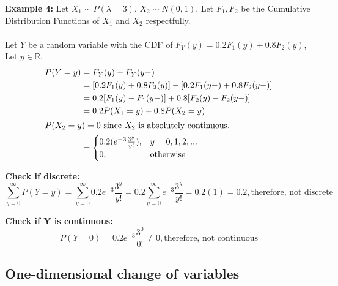 \documentclass[12pt]{article}
\begin{document}
\textbf{Example 4:} Let $X_1 \sim P(\lambda = 3)$, $X_2 \sim N(0,1)$. Let $F_1, F_2$ be the Cumulative Distribution Functions of $X_1$ and $X_2$ respectfully.\\
\\
Let $Y$ be a random variable with the CDF of $F_Y (y) = 0.2 F_1 (y) + 0.8 F_2 (y)$, Let $y\in\mathbb{R}$.
\begin{align*}
	P(Y = y) &= F_Y (y) - F_Y (y-)\\
	&= [0.2 F_1 (y) + 0.8 F_2 (y)] - [0.2 F_1 (y-) + 0.8 F_2 (y-)]\\
&= 0.2 [F_1 (y) - F_1 (y-)] + 0.8 [F_2 (y) - F_2 (y-)]\\
&= 0.2 P(X_1 = y) + 0.8 P(X_2 = y)\\
\shortintertext{$P(X_2 = y) = 0$ since $X_2$ is absolutely continuous.}
	&= \begin{cases}
0.2(e^{-3} \frac{3^y}{y!}), & y = 0,1,2,...\\
0, & \text{otherwise}
\end{cases}
\end{align*}

\textbf{Check if discrete:} $$\sum^\infty_{y=0} P(Y = y) = \sum^\infty_{y=0} 0.2 e^{-3} \frac{3^y}{y!} = 0.2 \sum^\infty_{y=0} e^{-3} \frac{3^y}{y!} = 0.2(1) = 0.2, \text{therefore, not discrete}$$

\textbf{Check if Y is continuous:} $$P(Y = 0) = 0.2 e^{-3} \frac{3^0}{0!} \neq 0, \text{therefore, not continuous}$$

\subsection{One-dimensional change of variables}
\end{document}
